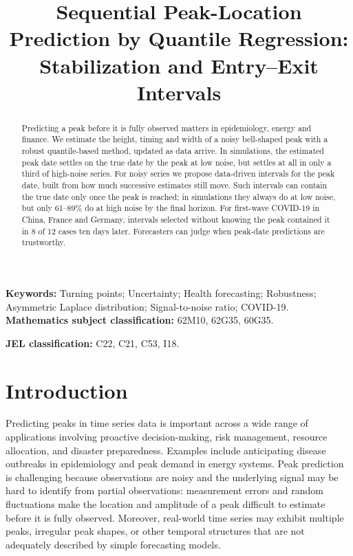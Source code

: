 \documentclass[12pt,a4paper]{article}
\title{\textbf{Sequential Peak-Location Prediction by Quantile Regression: Stabilization and Entry–Exit Intervals}}
\author{}
\date{}
\begin{document}
\maketitle

\begin{abstract}
	Predicting a peak before it is fully observed matters in epidemiology, energy and finance. We estimate the height, timing and width of a noisy bell-shaped peak with a robust quantile-based method, updated as data arrive. In simulations, the estimated peak date settles on the true date by the peak at low noise, but settles at all in only a third of high-noise series. For noisy series we propose data-driven intervals for the peak date, built from how much successive estimates still move. Such intervals can contain the true date only once the peak is reached; in simulations they always do at low noise, but only 61--89\% do at high noise by the final horizon. For first-wave COVID-19 in China, France and Germany, intervals selected without knowing the peak contained it in 8 of 12 cases ten days later. Forecasters can judge when peak-date predictions are trustworthy.
\end{abstract}

\noindent
\textbf{Keywords:} Turning points; Uncertainty; Health forecasting; Robustness;
Asymmetric Laplace distribution; Signal-to-noise ratio; COVID-19.\\

\noindent
\textbf{Mathematics subject classification:} 62M10, 62G35, 60G35.


\noindent
\textbf{JEL classification:} C22, C21, C53, I18.

\clearpage

\section{Introduction}
\label{section:1}

Predicting peaks in time series data is important across a wide range of
applications involving proactive decision-making, risk management, resource
allocation, and disaster preparedness. Examples include anticipating disease
outbreaks in epidemiology and peak demand in energy systems. Peak prediction is
challenging because observations are noisy and the underlying signal may be
hard to identify from partial observations: measurement errors and random
fluctuations make the location and amplitude of a peak difficult to estimate
before it is fully observed. Moreover, real-world time series may exhibit
multiple peaks, irregular peak shapes, or other temporal structures that are
not adequately described by simple forecasting models.
\end{document}
